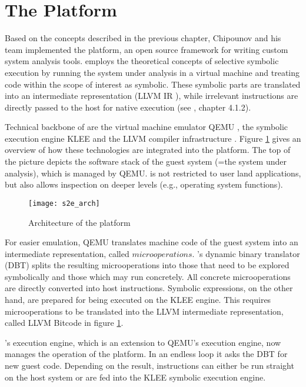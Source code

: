 \section{The \sse Platform}\label{sec:platform}

Based on the concepts described in the previous chapter, Chipounov and his team implemented the \sse platform, an open source framework for writing custom system analysis tools.
\sse employs the theoretical concepts of selective symbolic execution by running the system under analysis in a virtual machine and treating code within the scope of interest as symbolic.
These symbolic parts are translated into an intermediate representation (LLVM IR \cite{bitcode}), while irrelevant instructions are directly passed to the host for native execution (see \cite{chip12s2e}, chapter 4.1.2).


Technical backbone of \sse are the virtual machine emulator QEMU \cite{qemu, qemu05}, the symbolic execution engine KLEE \cite{klee, klee08} and the LLVM compiler infrastructure \cite{llvm, llvm04}.
Figure \ref{fig:arch} gives an overview of how these technologies are integrated into the \sse platform.
The top of the picture depicts the software stack of the guest system (=the system under analysis), which is managed by QEMU.
\sse is not restricted to user land applications, but also allows inspection on deeper levels (e.g., operating system functions).


\begin{figure}
\texttt{[image: s2e\_arch]}
\caption{Architecture of the \sse platform \cite{chip12s2e}}
\label{fig:arch}
\end{figure}


For easier emulation, QEMU translates machine code of the guest system into an intermediate representation, called $microoperations$.
\sse's dynamic binary translator (DBT) splits the resulting microoperations into those that need to be explored symbolically and those which may run concretely.
All concrete microoperations are directly converted into host instructions.
Symbolic expressions, on the other hand, are prepared for being executed on the KLEE engine.
This requires microoperations to be translated into the LLVM intermediate representation, called LLVM Bitcode \cite{bitcode} in figure \ref{fig:arch}.

\sse's execution engine, which is an extension to QEMU's execution engine, now manages the operation of the platform.
In an endless loop it asks the DBT for new guest code.
Depending on the result, instructions can either be run straight on the host system or are fed into the KLEE symbolic execution engine.

